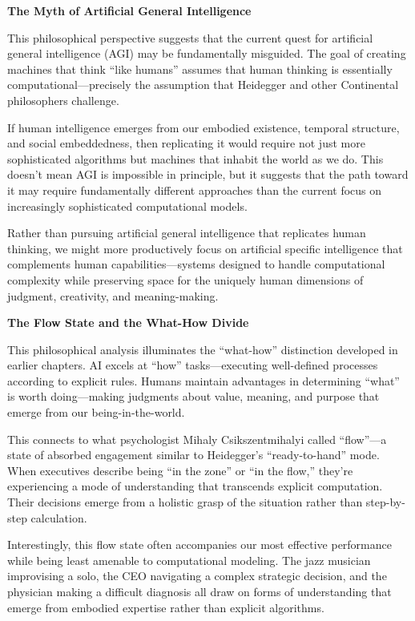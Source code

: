 \documentclass[
  Letterpaper,
]{scrbook}
\begin{document}
\textbf{The Myth of Artificial General Intelligence}

This philosophical perspective suggests that the current quest for
artificial general intelligence (AGI) may be fundamentally misguided.
The goal of creating machines that think ``like humans'' assumes that
human thinking is essentially computational---precisely the assumption
that Heidegger and other Continental philosophers challenge.

If human intelligence emerges from our embodied existence, temporal
structure, and social embeddedness, then replicating it would require
not just more sophisticated algorithms but machines that inhabit the
world as we do. This doesn't mean AGI is impossible in principle, but it
suggests that the path toward it may require fundamentally different
approaches than the current focus on increasingly sophisticated
computational models.

Rather than pursuing artificial general intelligence that replicates
human thinking, we might more productively focus on artificial specific
intelligence that complements human capabilities---systems designed to
handle computational complexity while preserving space for the uniquely
human dimensions of judgment, creativity, and meaning-making.

\textbf{The Flow State and the What-How Divide}

This philosophical analysis illuminates the ``what-how'' distinction
developed in earlier chapters. AI excels at ``how'' tasks---executing
well-defined processes according to explicit rules. Humans maintain
advantages in determining ``what'' is worth doing---making judgments
about value, meaning, and purpose that emerge from our
being-in-the-world.

This connects to what psychologist Mihaly Csikszentmihalyi called
``flow''---a state of absorbed engagement similar to Heidegger's
``ready-to-hand'' mode. When executives describe being ``in the zone''
or ``in the flow,'' they're experiencing a mode of understanding that
transcends explicit computation. Their decisions emerge from a holistic
grasp of the situation rather than step-by-step calculation.

Interestingly, this flow state often accompanies our most effective
performance while being least amenable to computational modeling. The
jazz musician improvising a solo, the CEO navigating a complex strategic
decision, and the physician making a difficult diagnosis all draw on
forms of understanding that emerge from embodied expertise rather than
explicit algorithms.
\end{document}
